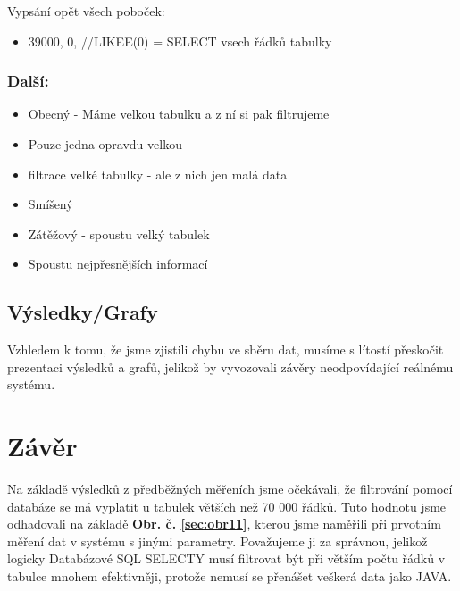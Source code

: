 \documentclass[a4paper, 11pt]{article}
\begin{document}
Vypsání opět všech poboček:
\begin{itemize}
\item     {39000, 0}, //LIKEE(0) = SELECT vsech řádků tabulky
\end{itemize}

\subsubsection{Další:}
\begin{itemize}
\item Obecný - Máme velkou tabulku a z ní si pak filtrujeme
\item Pouze jedna opravdu velkou
\item filtrace velké tabulky - ale z nich jen malá data
\item Smíšený
\item Zátěžový - spoustu velký tabulek
\item Spoustu nejpřesnějších informací
\end{itemize}


\subsection{Výsledky/Grafy}
Vzhledem k tomu, že jsme zjistili chybu ve sběru dat, musíme s lítostí přeskočit prezentaci výsledků a grafů, jelikož by vyvozovali závěry neodpovídající reálnému systému.

\section{Závěr}
Na základě výsledků z předběžných měřeních jsme očekávali, že filtrování pomocí databáze se má vyplatit u tabulek větších než 70 000 řádků. Tuto hodnotu jsme odhadovali na základě \textbf{Obr. č. \ref{sec:obr11}}, kterou jsme naměřili při prvotním měření dat v systému s jinými parametry. Považujeme ji za správnou, jelikož logicky Databázové SQL SELECTY musí filtrovat být při větším počtu řádků v tabulce mnohem efektivněji, protože nemusí se přenášet veškerá data jako JAVA.
\end{document}
